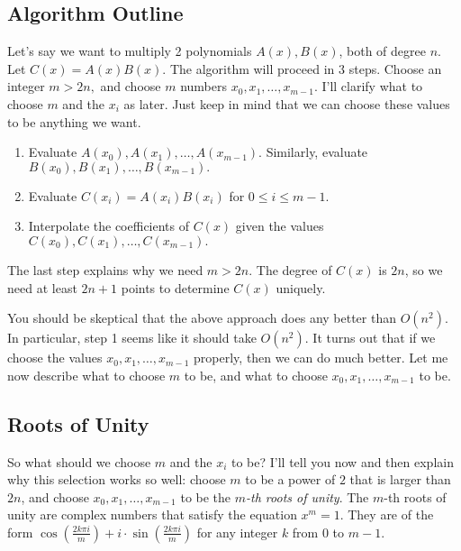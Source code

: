 \subsection{Algorithm Outline}

Let's say we want to multiply 2 polynomials $A(x), B(x)$, both of degree $n$. Let $C(x) = A(x)B(x).$ The algorithm will proceed in 3 steps. Choose an integer $m > 2n,$ and choose $m$ numbers $x_0, x_1, \dots, x_{m-1}.$ I'll clarify what to choose $m$ and the $x_i$ as later. Just keep in mind that we can choose these values to be anything we want.

\begin{enumerate}

\item Evaluate $A(x_0), A(x_1), \dots, A(x_{m-1}).$ Similarly, evaluate $B(x_0), B(x_1), \dots, B(x_{m-1}).$

\item Evaluate $C(x_i) = A(x_i)B(x_i)$ for $0 \le i \le m-1.$

\item Interpolate the coefficients of $C(x)$ given the values $C(x_0), C(x_1), \dots, C(x_{m-1}).$

\end{enumerate}

The last step explains why we need $m > 2n.$ The degree of $C(x)$ is $2n$, so we need at least $2n+1$ points to determine $C(x)$ uniquely.

You should be skeptical that the above approach does any better than $O(n^2).$ In particular, step 1 seems like it should take $O(n^2).$ It turns out that if we choose the values $x_0, x_1, \dots, x_{m-1}$ properly, then we can do much better. Let me now describe what to choose $m$ to be, and what to choose $x_0, x_1, \dots, x_{m-1}$ to be.

\subsection{Roots of Unity}

So what should we choose $m$ and the $x_i$ to be? I'll tell you now and then explain why this selection works so well: choose $m$ to be a power of $2$ that is larger than $2n$, and choose $x_0, x_1, \dots, x_{m-1}$ to be the $m$\emph{-th roots of unity}. The $m$-th roots of unity are complex numbers that satisfy the equation $x^m = 1.$ They are of the form $\cos\left(\frac{2k\pi i}{m}\right) + i \cdot \sin\left(\frac{2k\pi i}{m} \right)$ for any integer $k$ from $0$ to $m-1.$

